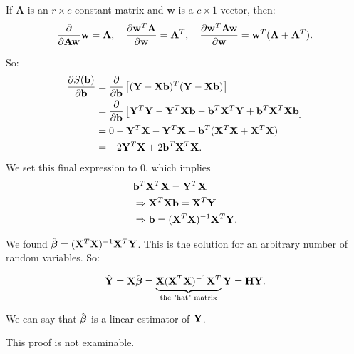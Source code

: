 \begin{remark}
	If $\mathbf A$ is an $r\times c$ constant matrix and $\mathbf w$ is a $c\times 1$ vector, then:
	\begin{align*}
			\pder{\mathbf A \mathbf w}{\mathbf w}=\mathbf A, \quad \pder[\mathbf w^T \mathbf A]{\mathbf w}=\mathbf A^T, \quad \pder[\mathbf w^T \mathbf A\mathbf w]{\mathbf w}=\mathbf w^T(\mathbf A+\mathbf A^T).
	\end{align*}
\end{remark}

So: 
\begin{align*}
		\pder[S(\bee)]{\bee}&=\pder{\bee}\left[ (\YY-\XX\bee)^T(\YY-\XX\bee) \right]\\ 
			    &= \pder{\bee} \left[ \YY^T\YY-\YY^T\XX\bee-\bee^T\XX^T\YY+\bee^T\XX^T\XX\bee \right]  \\
			    &= 0 - \YY^T\XX - \YY^T\XX+\bee^T(\XX^T\XX+\XX^T\XX)\\
				&=-2\YY^T\XX+2\bee^T\XX^T\XX
.\end{align*}
We set this final expression to 0, which implies
\begin{align*}
	&\bee^T \XX^T\XX = \YY^T\XX \\
	&\implies \XX^T\XX\bee = \XX^T\YY \\
	&\implies \bee = (\XX^T\XX)^{-1}\XX^T\YY  
.\end{align*}

We found $\hat{\bbeta}=(\XX^T\XX)^{-1}\XX^T\YY$. This is the solution for an arbitrary number of random variables. So:

\[
	\hat{\YY}=\XX \hat{\bbeta} = \underbrace{\XX(\XX^T\XX)^{-1}\XX^T}_{\text{the "hat" matrix}}\YY=\mathbf{H}\YY.
\] 
\begin{definition}
We can say that $\hat{\bbeta}$ is a linear estimator of $\YY$. 
\end{definition}

\begin{note}
	This proof is not examinable.
\end{note}
